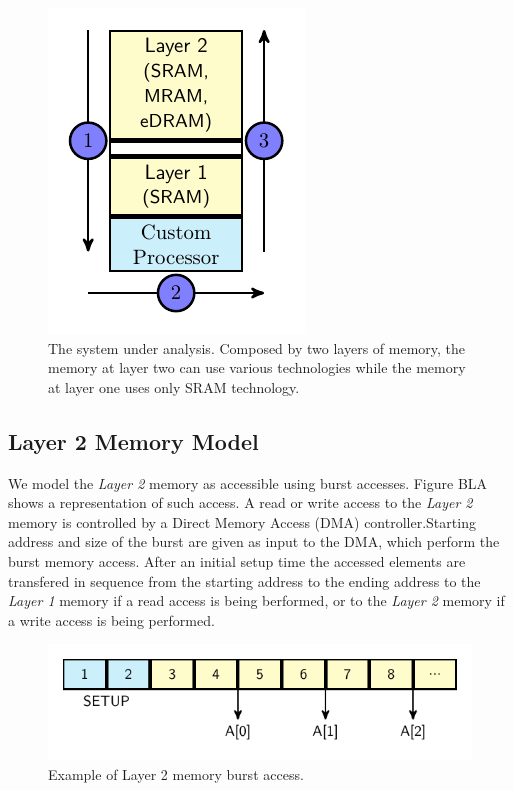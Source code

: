 \begin{figure}[tb] 
\centering
\includegraphics[width=0.5\columnwidth]{images/architecture.pdf}
\caption{\small The system under analysis. Composed by two layers of memory, the memory at layer two can use various technologies while the memory at layer one uses only SRAM technology.}
\label{fig:system}
\end{figure}

\subsection{Layer 2 Memory Model}
\label{ssec:layer2_model}
We model the \textit{Layer 2} memory as accessible using burst accesses. Figure BLA shows a representation of such access. A read or write access to the \textit{Layer 2} memory is controlled by a Direct Memory Access (DMA) controller.Starting address and size of the burst are given as input to the DMA, which perform the burst memory access. After an initial setup time the accessed elements are transfered in sequence from the starting address to the ending address to the \textit{Layer 1} memory if a read access is being berformed, or to the \textit{Layer 2} memory if a write access is being performed.

\begin{figure}[tb] 
\centering
\includegraphics[width=\columnwidth]{images/l2_model.pdf}
\caption{\small Example of Layer 2 memory burst access.}
\label{fig:l2model}
\end{figure}

